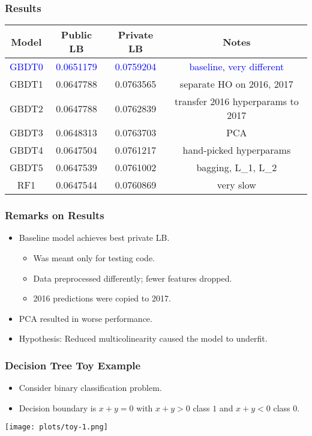 \documentclass{beamer}
\begin{document}
\begin{frame}
\frametitle{Results}
\begin{center}
\footnotesize
\begin{tabular}{|c|c|c|c|} \hline
Model & Public LB & Private LB & Notes \\ \hline
\textcolor{blue}{GBDT0} & \textcolor{blue}{0.0651179} & \textcolor{blue}{0.0759204} & \textcolor{blue}{baseline, very different} \\
GBDT1 & 0.0647788 & 0.0763565 & separate HO on 2016, 2017 \\
GBDT2 & 0.0647788 & 0.0762839 & transfer 2016 hyperparams to 2017 \\
GBDT3 & 0.0648313 & 0.0763703 & PCA \\
GBDT4 & 0.0647504 & 0.0761217 & hand-picked hyperparams \\
GBDT5 & 0.0647539 & 0.0761002 & bagging, L\_1, L\_2 \\
RF1 & 0.0647544 & 0.0760869 & very slow \\
\hline
\end{tabular}
\end{center}
\end{frame}

\begin{frame}
\frametitle{Remarks on Results}
\begin{itemize}
\item Baseline model achieves best private LB.
\begin{itemize}
\item Was meant only for testing code.
\item Data preprocessed differently; fewer features dropped.
\item 2016 predictions were copied to 2017.
\end{itemize}
\item PCA resulted in worse performance.
\item Hypothesis: Reduced multicolinearity caused the model to underfit.
\end{itemize}
\end{frame}

\begin{frame}
\frametitle{Decision Tree Toy Example}
\begin{itemize}
\item Consider binary classification problem.
\item Decision boundary is $x+y=0$ with $x+y>0$ class $1$ and $x+y<0$ class $0$.
\end{itemize}
\begin{center}
\texttt{[image: plots/toy-1.png]}
\end{center}
\end{frame}
\end{document}
